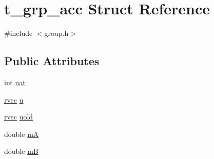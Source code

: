 \hypertarget{structt__grp__acc}{\section{t\-\_\-grp\-\_\-acc \-Struct \-Reference}
\label{structt__grp__acc}
}


{\ttfamily \#include $<$group.\-h$>$}

\subsection*{\-Public \-Attributes}
\begin{DoxyCompactItemize}
\item 
int \hyperlink{structt__grp__acc_a1787266b47365154710d92ad74dcc1d5}{nat}
\item 
\hyperlink{share_2template_2gromacs_2types_2simple_8h_aa02a552a4abd2f180c282a083dc3a999}{rvec} \hyperlink{structt__grp__acc_a06bab7de566adca48c7cf3da981e5107}{u}
\item 
\hyperlink{share_2template_2gromacs_2types_2simple_8h_aa02a552a4abd2f180c282a083dc3a999}{rvec} \hyperlink{structt__grp__acc_ace4b9cbda4532c0ec585e9b0376102a2}{uold}
\item 
double \hyperlink{structt__grp__acc_a0635e7557c11354f4883645d45102a46}{m\-A}
\item 
double \hyperlink{structt__grp__acc_a54b00e38ec0a72f808ef5a143b03813d}{m\-B}
\end{DoxyCompactItemize}


